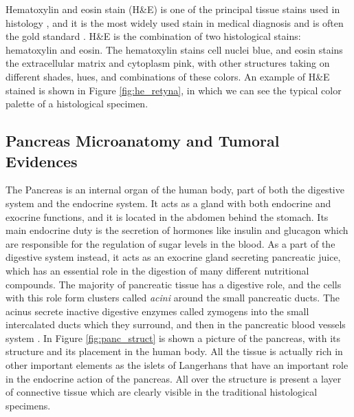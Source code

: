     Hematoxylin and eosin stain (H\&E) is one of the principal tissue stains used in histology \cite{he_stain}, and it is the most widely used stain in medical diagnosis and is often the gold standard \cite{Rosai2007}. H\&E is the combination of two histological stains: hematoxylin and eosin. The hematoxylin stains cell nuclei blue, and eosin stains the extracellular matrix and cytoplasm pink, with other structures taking on different shades, hues, and combinations of these colors. An example of H\&E stained is shown in Figure \ref{fig:he_retyna}, in which we can see the typical color palette of a histological specimen.

\subsection{Pancreas Microanatomy and Tumoral Evidences} \label{ssec:pancr_anat}
    The Pancreas is an internal organ of the human body, part of both the digestive system and the endocrine system. It acts as a gland with both endocrine and exocrine functions, and it is located in the abdomen behind the stomach. Its main endocrine duty is the secretion of hormones like insulin and glucagon which are responsible for the regulation of sugar levels in the blood. As a part of the digestive system instead, it acts as an exocrine gland secreting pancreatic juice, which has an essential role in the digestion of many different nutritional compounds. The majority of pancreatic tissue has a digestive role, and the cells with this role form clusters called \textit{acini} around the small pancreatic ducts. The acinus secrete inactive digestive enzymes called zymogens into the small intercalated ducts which they surround, and then in the pancreatic blood vessels system \cite{Pancreas}. In Figure \ref{fig:panc_struct} is shown a picture of the pancreas, with its structure and its placement in the human body. All the tissue is actually rich in other important elements as the islets of Langerhans that have an important role in the endocrine action of the pancreas. All over the structure is present a layer of connective tissue which are clearly visible in the traditional histological specimens.

